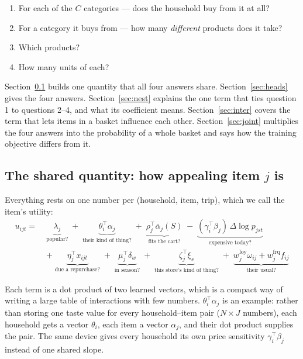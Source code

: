\documentclass[11pt]{article}
\begin{document}
\begin{enumerate}
\item For each of the $C$ categories --- does the household buy from it at all?
\item For a category it buys from --- how many \emph{different} products does it take?
\item Which products?
\item How many units of each?
\end{enumerate}

Section~\ref{sec:util} builds one quantity that all four answers share.
Section~\ref{sec:heads} gives the four answers. Section~\ref{sec:nest} explains the one
term that ties question 1 to questions 2--4, and what its coefficient means.
Section~\ref{sec:inter} covers the term that lets items in a basket influence each other.
Section~\ref{sec:joint} multiplies the four answers into the probability of a whole basket
and says how the training objective differs from it.

\subsection{The shared quantity: how appealing item \texorpdfstring{$j$}{j} is}
\label{sec:util}

Everything rests on one number per (household, item, trip), which we call the item's
utility:
\begin{equation}
\begin{aligned}
u_{ijt}=\;&\underbrace{\lambda_j}_{\text{popular?}}
\;+\;\underbrace{\theta_i^{\top}\alpha_j}_{\text{their kind of thing?}}
\;+\;\underbrace{\rho_j^{\top}\bar\alpha_j(S)}_{\text{fits the cart?}}
\;-\;\underbrace{(\gamma_i^{\top}\beta_j)\,\Delta\log p_{jst}}_{\text{expensive today?}}\\[4pt]
&+\;\underbrace{\eta_j^{\top}x_{ijt}}_{\text{due a repurchase?}}
\;+\;\underbrace{\mu_j^{\top}\delta_w}_{\text{in season?}}
\;+\;\underbrace{\zeta_j^{\top}\xi_s}_{\text{this store's kind of thing?}}
\;+\;\underbrace{w^{\mathrm{loy}}_j\omega_{ij}+w^{\mathrm{frq}}_jf_{ij}}_{\text{their usual?}}
\end{aligned}
\label{eq:util}
\end{equation}

Each term is a dot product of two learned vectors, which is a compact way of writing a
large table of interactions with few numbers. $\theta_i^{\top}\alpha_j$ is an example:
rather than storing one taste value for every household--item pair ($N\times J$ numbers),
each household gets a vector $\theta_i$, each item a vector $\alpha_j$, and their dot
product supplies the pair. The same device gives every household its own price
sensitivity $\gamma_i^{\top}\beta_j$ instead of one shared slope.
\end{document}
